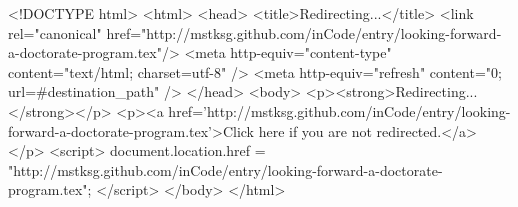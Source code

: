 <!DOCTYPE html>
<html>
<head>
<title>Redirecting...</title>
<link rel="canonical" href="http://mstksg.github.com/inCode/entry/looking-forward-a-doctorate-program.tex"/>
<meta http-equiv="content-type" content="text/html; charset=utf-8" />
<meta http-equiv="refresh" content="0; url=#{destination_path}" />
</head>
<body>
  <p><strong>Redirecting...</strong></p>
  <p><a href='http://mstksg.github.com/inCode/entry/looking-forward-a-doctorate-program.tex'>Click here if you are not redirected.</a></p>
  <script>
    document.location.href = "http://mstksg.github.com/inCode/entry/looking-forward-a-doctorate-program.tex";
  </script>
</body>
</html>
